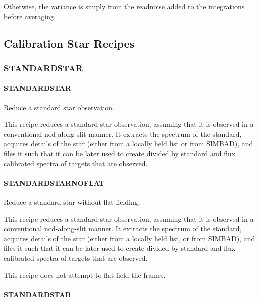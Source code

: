 \documentclass[twoside,11pt]{article}
\renewcommand{\_}{\texttt{\symbol{95}}}
\begin{document}
Otherwise, the variance is simply from the readnoise added to the integrations
before averaging.



\subsection{Calibration Star Recipes}

\subsubsection{STANDARD\_STAR}
\paragraph{STANDARD\_STAR\label{STANDARD_STAR}}


Reduce a standard star observation.


\mbox{}


This recipe reduces a standard star observation, assuming that it is
observed in a conventional nod-along-slit manner. It extracts the
spectrum of the standard, acquires details of the star (either from a
locally held list or from SIMBAD), and files it such that it can be
later used to create divided by standard and flux calibrated spectra
of targets that are observed.

\paragraph{STANDARD\_STAR\_NOFLAT\label{STANDARD_STAR_NOFLAT}}


Reduce a standard star without flat-fielding.


\mbox{}


This recipe reduces a standard star observation, assuming that it is
observed in a conventional nod-along-slit manner. It extracts the
spectrum of the standard, acquires details of the star (either from a
locally held list, or from SIMBAD), and files it such that it can be
later used to create divided by standard and flux calibrated spectra
of targets that are observed.



This recipe does not attempt to flat-field the frames.

\paragraph{\_STANDARD\_STAR\_\label{_STANDARD_STAR_}}
\end{document}
